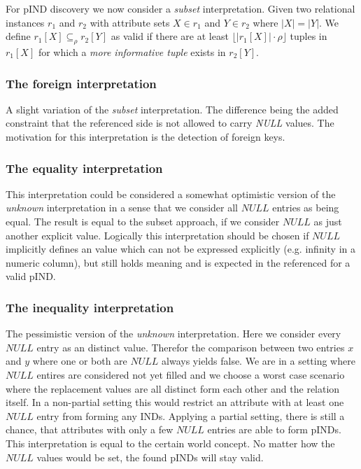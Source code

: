 For pIND discovery we now consider a \textit{subset} interpretation. Given two relational instances $r_1$ and $r_2$ with attribute sets
$X \in r_1$ and $Y \in r_2$ where $|X| = |Y|$. We define $r_1[X] \subseteq_\rho r_2[Y]$ as valid if there are at least $\lfloor |r_1[X]| \cdot \rho \rfloor$
tuples in $r_1[X]$ for which a \textit{more informative tuple} exists in $r_2[Y]$.

\subsubsection*{The \textbf{foreign} interpretation}
A slight variation of the \textit{subset} interpretation. The difference being the added constraint that the referenced side is not allowed to
carry \textit{NULL} values. The motivation for this interpretation is the detection of foreign keys.

\subsubsection*{The \textbf{equality} interpretation}
This interpretation could be considered a somewhat optimistic version of the \textit{unknown} interpretation in a sense that we consider all $NULL$ entries as being equal. The result is equal to the subset approach, if we consider $NULL$ as just another explicit value. Logically this interpretation should be chosen if $NULL$ implicitly defines an value which can not be expressed explicitly (e.g. infinity in a numeric column), but still holds meaning and is expected in the referenced for a valid pIND.

\subsubsection*{The \textbf{inequality} interpretation}
The pessimistic version of the \textit{unknown} interpretation. Here we consider every $NULL$ entry as an distinct value. Therefor the comparison between two entries $x$ and $y$ where one or both are $NULL$ always yields false. We are in a setting where $NULL$ entires are considered not yet filled and we choose a worst case scenario where the replacement values are all distinct form each other and the relation itself. In a non-partial setting this would restrict an attribute with at least one $NULL$ entry from forming any INDs. Applying a partial setting, there is still a chance, that attributes with only a few $NULL$ entries are able to form pINDs. This interpretation is equal to the certain world concept. No matter how the $NULL$ values would be set, the found pINDs will stay valid.

